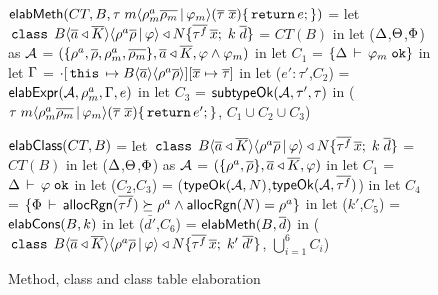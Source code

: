\newcommand{\hdOf}[2]{\C{class}\; #1\angAlpha\inang{\rhoalloc\rhobar \,|\, #2} \extends \fbN}
\begin{figure}

\begin{codeml}
${\sf elabMeth}(CT, B, \tau \; m\langle \rho^a_m\overline{\rho_m} \,|\, \varphi_m \rangle (\overline{\tau} \; \overline{x})\{\,{\tt return}\, e;\})$ = 
  let $\hdOf{B}{\varphi}\{\bar{\tau^f}\,\xbar;\;k\;\bar{d}\}$ = $CT(B)$ in
  let ($\Delta$,$\Theta$,$\Phi$) as ${\mathcal{A}}$ = 
            $(\{\rho^a,\overline{\rho},\rho^a_m,\overline{\rho_m}\},\overline{a} \triangleleft \overline{K},\varphi \wedge \varphi_m)$ in
  let $C_1$ = $\{\Delta\,\vdash\,\varphi_m \; \texttt{ok}\}$ in
  let $\Gamma$ = $\cdot[\,{\tt this}\, \mapsto B\langle \overline{a} \rangle\langle \rho^a\overline{\rho} \rangle][\overline{x} \mapsto \overline{\tau}]$ in
  let ($e':\tau'$,$C_2$) = ${\sf elabExpr} ({\mathcal{A}},\rho^a_m,\Gamma,e)$ in
  let $C_3$ = ${\sf subtypeOk}({{\mathcal{A}}},{\tau'},{\tau})$ in
    ($\tau \; m\langle \rho^a_m\overline{\rho_m} \,|\, \varphi_m \rangle (\overline{\tau} \;
    \overline{x})\{\,{\tt return}\, e';\}$, $C_1 \cup C_2 \cup C_3$)
\end{codeml}

\begin{codeml}
${\sf elabClass}(CT,B)$ = 
  let $\hdOf{B}{\varphi}\{\bar{\tau^f}\,\xbar;\;k\;\bar{d}\}$ = $CT(B)$ in
  let ($\Delta$,$\Theta$,$\Phi$) as ${\mathcal{A}}$ = $(\{\rho^a,\overline{\rho}\},\overline{a} \triangleleft \overline{K},\varphi)$ in
  let $C_1$ = $\Delta\,\vdash\,\varphi \; \texttt{ok}$ in
  let ($C_2$,$C_3$) = (${\sf typeOk}({{\mathcal{A}}},{N})$,${\sf typeOk}({{\mathcal{A}}},{\overline{\tau^f}})$) in
  let $C_4$ = $\{\Phi\,\vdash\,{\sf allocRgn}(\overline{\tau^f}) \succeq \rho^a \wedge {\sf allocRgn}(N) = \rho^a\}$ in
  let ($k'$,$C_5$) = ${\sf elabCons}(B,k)$ in
  let ($\bar{d'}$,$C_6$) = ${\sf elabMeth}(B,\overline{d})$ in
    ($\hdOf{B}{\varphi}\{\bar{\tau^f}\,\xbar;\;k'\;\bar{d'}\}$, $\bigcup_{i=1}^6 C_i$)
\end{codeml}
%
%       

\caption{Method, class and class table elaboration}
\label{fig:fb-elabmeth}
\end{figure}
